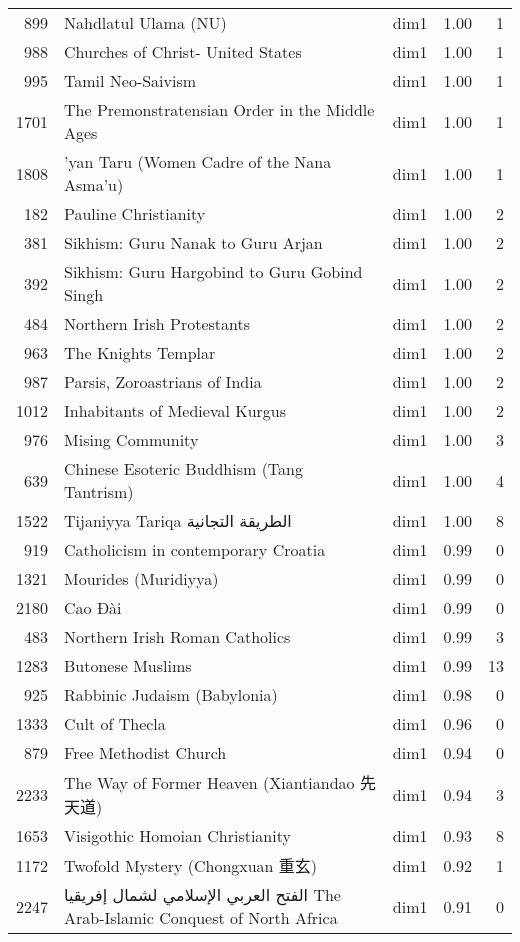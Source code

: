 \begin{tabular}{rllrr}
899 & Nahdlatul Ulama (NU) & dim1 & 1.00 & 1 \\
988 & Churches of Christ- United States & dim1 & 1.00 & 1 \\
995 & Tamil Neo-Saivism & dim1 & 1.00 & 1 \\
1701 & The Premonstratensian Order in the Middle Ages & dim1 & 1.00 & 1 \\
1808 & 'yan Taru (Women Cadre of the Nana Asma'u) & dim1 & 1.00 & 1 \\
182 & Pauline Christianity & dim1 & 1.00 & 2 \\
381 & Sikhism: Guru Nanak to Guru Arjan & dim1 & 1.00 & 2 \\
392 & Sikhism: Guru Hargobind to Guru Gobind Singh & dim1 & 1.00 & 2 \\
484 & Northern Irish Protestants & dim1 & 1.00 & 2 \\
963 & The Knights Templar & dim1 & 1.00 & 2 \\
987 & Parsis, Zoroastrians of India & dim1 & 1.00 & 2 \\
1012 & Inhabitants of Medieval Kurgus & dim1 & 1.00 & 2 \\
976 & Mising Community & dim1 & 1.00 & 3 \\
639 & Chinese Esoteric Buddhism (Tang Tantrism) & dim1 & 1.00 & 4 \\
1522 & Tijaniyya Tariqa الطريقة التجانية & dim1 & 1.00 & 8 \\
919 & Catholicism in contemporary Croatia & dim1 & 0.99 & 0 \\
1321 & Mourides (Muridiyya) & dim1 & 0.99 & 0 \\
2180 & Cao Đài & dim1 & 0.99 & 0 \\
483 & Northern Irish Roman Catholics & dim1 & 0.99 & 3 \\
1283 & Butonese Muslims & dim1 & 0.99 & 13 \\
925 & Rabbinic Judaism (Babylonia) & dim1 & 0.98 & 0 \\
1333 & Cult of Thecla & dim1 & 0.96 & 0 \\
879 & Free Methodist Church & dim1 & 0.94 & 0 \\
2233 & The Way of Former Heaven (Xiantiandao 先天道) & dim1 & 0.94 & 3 \\
1653 & Visigothic Homoian Christianity & dim1 & 0.93 & 8 \\
1172 & Twofold Mystery (Chongxuan 重玄) & dim1 & 0.92 & 1 \\
2247 & الفتح العربي الإسلامي لشمال إفريقيا The Arab-Islamic Conquest of North Africa & dim1 & 0.91 & 0 \\

\end{tabular}
